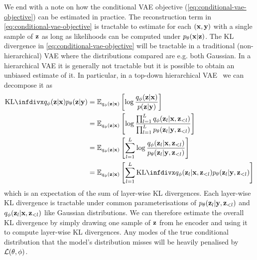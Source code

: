 We end with a note on how the conditional VAE objective (\cref{eq:conditional-vae-objective}) can be estimated in practice. The reconstruction term in \cref{eq:conditional-vae-objective} is tractable to estimate for each $({\mathbf{x}},{\mathbf{y}})$ with a single sample of ${\mathbf{z}}$ as long as likelihoods can be computed under $p_\theta({\mathbf{x}}|{\mathbf{z}})$. The KL divergence in \cref{eq:conditional-vae-objective} will be tractable in  a traditional (non-hierarchical) VAE where the distributions compared are e.g. both Gaussian. In a hierarchical VAE it is generally not tractable but it is possible to obtain an unbiased estimate of it. In particular, in a top-down hierarchical VAE~\citep{vahdat2020nvae,child2020very} we can decompose it as
\begin{align}
    \kl{q_\phi(\rvz|\rvx)}{p_\theta(\rvz|\rvy)} &= \EX_{q_\phi(\rvz|\rvx)} \left[  \log \frac{q_\phi(\rvz|\rvx)}{p(\rvz|\rvy)} \right] \\
    &= \EX_{q_\phi(\rvz|\rvx)} \left[ \log \frac{\prod_{l=1}^L q_\phi(\rvz_l|\rvx,\rvz_{<l})}{\prod_{l=1}^L p_\theta(\rvz_l|\rvy,\rvz_{<l})} \right] \\
    &= \EX_{q_\phi(\rvz|\rvx)} \left[ \sum_{l=1}^L \log \frac{q_\phi(\rvz_l|\rvx,\rvz_{<l})}{p_\theta(\rvz_l|\rvy,\rvz_{<l})} \right] \\
    &= \EX_{q_\phi(\rvz|\rvx)} \left[ \sum_{l=1}^L \kl{q_\phi(\rvz_l|\rvx,\rvz_{<l})}{p_\theta(\rvz_l|\rvy,\rvz_{<l})} \right]
\end{align}
which is an expectation of the sum of layer-wise KL divergences. Each layer-wise KL divergence is tractable under common parameterisations of $p_\theta({\mathbf{z}}_l|{\mathbf{y}},{\mathbf{z}}_{<l})$ and $q_\phi({\mathbf{z}}_l|{\mathbf{x}},{\mathbf{z}}_{<l})$ like Gaussian distributions. We can therefore estimate the overall KL divergence by simply drawing one sample of ${\mathbf{z}}$ from he encoder and using it to compute layer-wise KL divergences. Any modes of the true conditional distribution that the model's distribution misses will be heavily penalised by ${\mathcal{L}}(\theta,\phi)$. 



